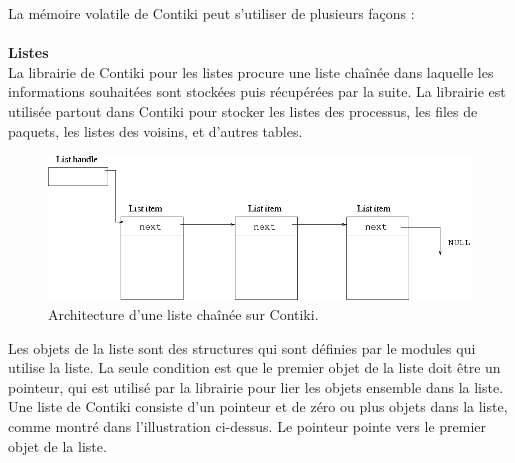 			La mémoire volatile de Contiki peut s'utiliser de plusieurs façons :\\ \\
			\textbf{Listes}\\
				La librairie de Contiki pour les listes procure une liste chaînée dans laquelle les informations souhaitées sont stockées puis récupérées par la suite. La librairie est utilisée partout dans Contiki pour stocker les listes des processus, les files de paquets, les listes des voisins, et d'autres tables.\\
				\begin{figure}[htp]
					\centering
					\includegraphics[width=16cm]{images/linked-list}
					\caption{Architecture d'une liste chaînée sur Contiki.}
					\label{fig:list}
				\end{figure}
				Les objets de la liste sont des structures qui sont définies par le modules qui utilise la liste. La seule condition est que le premier objet de la liste doit être un pointeur, qui est utilisé par la librairie pour lier les objets ensemble dans la liste.\\
				Une liste de Contiki consiste d'un pointeur et de zéro ou plus objets dans la liste, comme montré dans l'illustration ci-dessus. Le pointeur pointe vers le premier objet de la liste.\\
				
